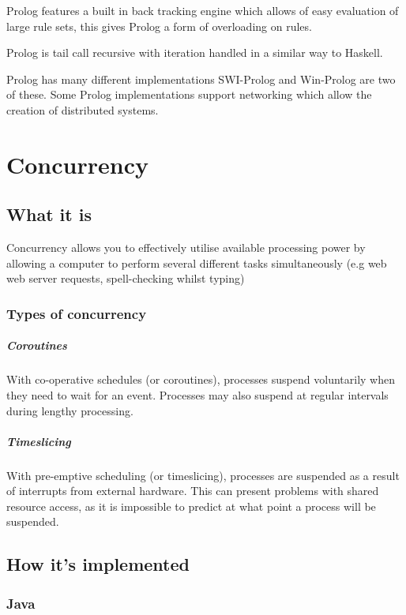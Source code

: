 \documentclass[a4paper,oneside]{report}
\begin{document}
	Prolog features a built in back tracking engine which allows of easy evaluation of large rule sets, this gives Prolog a form of overloading on rules. 
	
	Prolog is tail call recursive with iteration handled in a similar way to Haskell.
	
	Prolog has many different implementations SWI-Prolog and Win-Prolog are two of these. Some Prolog implementations support networking which allow the creation of distributed systems. 


\chapter{Concurrency}
	\section{What it is}
	
	Concurrency allows you to effectively utilise available processing power by allowing a computer to perform several different tasks simultaneously (e.g web web server requests, spell-checking whilst typing)
	
    	\subsection{Types of concurrency}
    	
    	\paragraph{Coroutines} With co-operative schedules (or coroutines), processes suspend voluntarily  when they need to wait for an event. Processes may also suspend at regular intervals during lengthy processing.
    	
    	\paragraph{Timeslicing} With pre-emptive scheduling (or timeslicing), processes are suspended as a result of interrupts from external hardware. This can present problems with shared resource access, as it is impossible to predict at what point a process will be suspended.
    	
  	\section{How it's implemented}
  	
    	\subsection{Java}
      		
\end{document}
